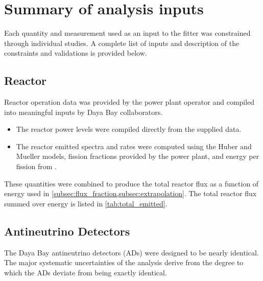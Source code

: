 \chapter{Summary of analysis inputs}
\label{ap:inputs_summary}

Each quantity and measurement used as an input to the fitter
was constrained through individual studies.
A complete list of inputs and description of the constraints and validations
is provided below.

\section{Reactor}
\label{sec:summary_reactor}

Reactor operation data was provided by the power plant operator
and compiled into meaningful inputs by Daya Bay collaborators.
\begin{itemize}
    \item The reactor power levels were compiled directly from
        the supplied data.
    \item The reactor \nuebar{} emitted spectra and rates
        were computed using the Huber \cite{reactor_huber}
        and Mueller \cite{reactor_mueller} models,
        fission fractions provided by the power plant,
        and energy per fission from \cite{thermal_fission}.
\end{itemize}
These quantities were combined to produce the total reactor flux
as a function of energy used in \cref{subsec:flux_fraction,subsec:extrapolation}.
The total reactor flux summed over energy is listed in \cref{tab:total_emitted}.

\section{Antineutrino Detectors}
\label{sec:summary_ads}

The Daya Bay antineutrino detectors (ADs) were designed to be
nearly identical.
The major systematic uncertainties of the analysis derive from
the degree to which the ADs deviate from being exactly identical.

